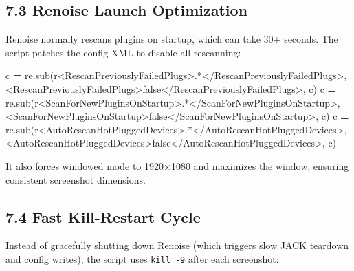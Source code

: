 \documentclass[
  11pt,
  oneside]{report}
\newenvironment{Shaded}{\begin{snugshade}}{\end{snugshade}}
\newcommand{\AttributeTok}[1]{\textcolor[rgb]{0.13,0.29,0.53}{#1}}
\newcommand{\BuiltInTok}[1]{#1}
\newcommand{\DecValTok}[1]{\textcolor[rgb]{0.00,0.00,0.81}{#1}}
\newcommand{\FunctionTok}[1]{\textcolor[rgb]{0.13,0.29,0.53}{\textbf{#1}}}
\newcommand{\KeywordTok}[1]{\textcolor[rgb]{0.13,0.29,0.53}{\textbf{#1}}}
\newcommand{\NormalTok}[1]{#1}
\newcommand{\OperatorTok}[1]{\textcolor[rgb]{0.81,0.36,0.00}{\textbf{#1}}}
\newcommand{\StringTok}[1]{\textcolor[rgb]{0.31,0.60,0.02}{#1}}
\newcommand{\VariableTok}[1]{\textcolor[rgb]{0.00,0.00,0.00}{#1}}
\newcommand{\VerbatimStringTok}[1]{\textcolor[rgb]{0.31,0.60,0.02}{#1}}
\begin{document}
\subsection{7.3 Renoise Launch
Optimization}\label{renoise-launch-optimization}

Renoise normally rescans plugins on startup, which can take 30+ seconds.
The script patches the config XML to disable all rescanning:

\begin{Shaded}
\begin{Highlighting}[]
\NormalTok{c }\OperatorTok{=}\NormalTok{ re.sub(}\VerbatimStringTok{r\textquotesingle{}\textless{}RescanPreviouslyFailedPlugs\textgreater{}.*\textless{}/RescanPreviouslyFailedPlugs\textgreater{}\textquotesingle{}}\NormalTok{,}
           \StringTok{\textquotesingle{}\textless{}RescanPreviouslyFailedPlugs\textgreater{}false\textless{}/RescanPreviouslyFailedPlugs\textgreater{}\textquotesingle{}}\NormalTok{, c)}
\NormalTok{c }\OperatorTok{=}\NormalTok{ re.sub(}\VerbatimStringTok{r\textquotesingle{}\textless{}ScanForNewPluginsOnStartup\textgreater{}.*\textless{}/ScanForNewPluginsOnStartup\textgreater{}\textquotesingle{}}\NormalTok{,}
           \StringTok{\textquotesingle{}\textless{}ScanForNewPluginsOnStartup\textgreater{}false\textless{}/ScanForNewPluginsOnStartup\textgreater{}\textquotesingle{}}\NormalTok{, c)}
\NormalTok{c }\OperatorTok{=}\NormalTok{ re.sub(}\VerbatimStringTok{r\textquotesingle{}\textless{}AutoRescanHotPluggedDevices\textgreater{}.*\textless{}/AutoRescanHotPluggedDevices\textgreater{}\textquotesingle{}}\NormalTok{,}
           \StringTok{\textquotesingle{}\textless{}AutoRescanHotPluggedDevices\textgreater{}false\textless{}/AutoRescanHotPluggedDevices\textgreater{}\textquotesingle{}}\NormalTok{, c)}
\end{Highlighting}
\end{Shaded}

It also forces windowed mode to 1920×1080 and maximizes the window,
ensuring consistent screenshot dimensions.

\subsection{7.4 Fast Kill-Restart Cycle}\label{fast-kill-restart-cycle}

Instead of gracefully shutting down Renoise (which triggers slow JACK
teardown and config writes), the script uses \texttt{kill\ -9} after
each screenshot:

\begin{Shaded}
\end{Shaded}
\end{document}
